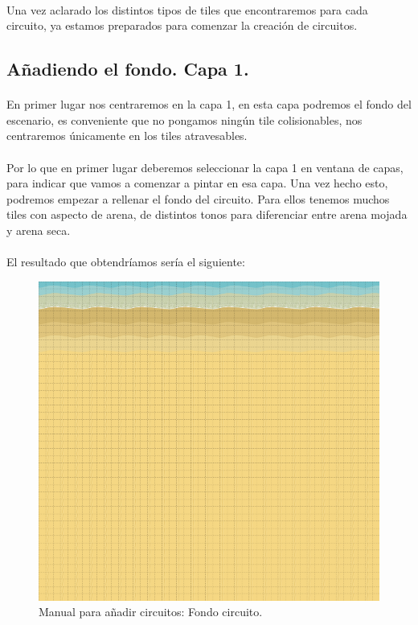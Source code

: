 \paragraph{}
Una vez aclarado los distintos tipos de tiles que encontraremos para cada circuito, ya estamos preparados para comenzar la creación
de circuitos.

\subsection{Añadiendo el fondo. Capa 1.}

\paragraph{}
En primer lugar nos centraremos en la capa 1, en esta capa podremos el fondo
del escenario, es conveniente que no pongamos ningún 
tile colisionables, nos centraremos únicamente en los tiles atravesables.

\paragraph{}
Por lo que en primer lugar deberemos seleccionar la capa 1 en ventana de capas, para indicar que vamos a comenzar a pintar en esa
capa. Una vez hecho esto, podremos empezar a rellenar el fondo del circuito. Para ellos tenemos muchos tiles con aspecto de arena,
de distintos tonos para diferenciar entre arena mojada y arena seca.

\paragraph{}
El resultado que obtendríamos sería el siguiente:

\begin{figure}[H]
  \label{circuito_fondo2}
  \begin{center}
    \includegraphics[scale=0.5]{imagenes/manualcircuito/circuito_fondo2.png}
  \end{center}
  \caption{Manual para añadir circuitos: Fondo circuito.}
\end{figure}

